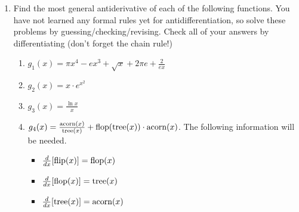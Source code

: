 \documentclass{article}
\begin{document}
\begin{enumerate}
                \item Find the most general antiderivative of each of the following functions. You have not learned any formal rules yet for antidifferentiation, so solve these problems by guessing/checking/revising. Check all of your answers by differentiating (don't forget the chain rule!)
                    \begin{enumerate}
                        \item $\displaystyle g_1(x) = \pi x^4-ex^3+\sqrt{x}+2\pi e + \frac{2}{ex}$
                        \item $g_2(x) = x\cdot e^{x^2}$
                        \item $g_3(x) = \frac{\ln{x}}{x}$
                        \item $g_4(x)= \frac{\textnormal{acorn}(x)}{\textnormal{tree}(x)} +\textnormal{flop}(\textnormal{tree}(x))\cdot \textnormal{acorn}(x)$.  The following information will be needed.
                        \begin{itemize}
                            \item $\frac{d}{dx}[\textnormal{flip}(x)] = \textnormal{flop}(x)$
                            \item $\frac{d}{dx}[\textnormal{flop}(x)] = \textnormal{tree}(x)$
                            \item $\frac{d}{dx}[\textnormal{tree}(x)] = \textnormal{acorn}(x)$
                        \end{itemize}
                    \end{enumerate}
 

\end{enumerate}
\end{document}

